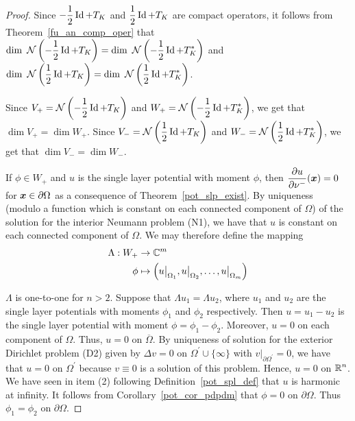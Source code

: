 \begin{proof}
Since $\displaystyle -\frac{1}{2} \operatorname{Id} + T_K$ and
$\displaystyle \frac{1}{2} \operatorname{Id} + T_K$ are compact operators, it
follows from Theorem~\ref{fu_an_comp_oper} that
$\displaystyle \dim\ \mathcal{N} \left(-\frac{1}{2} \operatorname{Id} + T_K\right) =
\dim\ \mathcal{N} \left(-\frac{1}{2} \operatorname{Id} + T_K^\ast \right)$
and $\displaystyle \dim\ \mathcal{N} \left(\frac{1}{2} \operatorname{Id} + T_K\right) =
\dim\ \mathcal{N} \left(\frac{1}{2} \operatorname{Id} + T_K^\ast \right)$.

Since $\displaystyle V_+ = \mathcal{N} \left(-\frac{1}{2} \operatorname{Id} + T_K\right)$
and $\displaystyle W_+ = \mathcal{N} \left(-\frac{1}{2} \operatorname{Id} + T_K^\ast \right)$, 
we get that $\dim V_+ = \dim W_+$.  Since
$\displaystyle V_- = \mathcal{N} \left(\frac{1}{2} \operatorname{Id} + T_K\right)$
and $\displaystyle W_- = \mathcal{N} \left(\frac{1}{2} \operatorname{Id} + T_K^\ast \right)$, 
we get that $\dim V_- = \dim W_-$.

 If $\phi \in W_+$ and $u$ is the single layer potential with
moment $\phi$, then $\displaystyle \frac{\partial{u}}{\partial \nu^-}({\bm{x}}) = 0$
for ${\bm{x}} \in \partial \Omega$ as a consequence of
Theorem~\ref{pot_slp_exist}.  By uniqueness (modulo a
function which is constant on each connected component of $\Omega$)
of the solution for the interior Neumann problem (N1), we have that
$u$ is constant on each connected component of $\Omega$.  We may
therefore define the mapping
\begin{align*}
\Lambda : W_+ & \rightarrow \mathbb{C}^m \\
\phi &\mapsto \left( u\big|_{\Omega_1}, u\big|_{\Omega_2},
\ldots, u\big|_{\Omega_m}\right)
\end{align*}

 $\Lambda$ is one-to-one for $n>2$.  Suppose that
$\Lambda u_1 = \Lambda u_2$, where $u_1$ and $u_2$ are the single
layer potentials with moments $\phi_1$ and $\phi_2$ respectively.
Then $u=u_1-u_2$ is the single layer potential with moment
$\phi = \phi_1-\phi_2$.  Moreover, $u = 0$ on each component of
$\Omega$.  Thus, $u = 0$ on $\overline{\Omega}$.  By uniqueness of
solution for the exterior Dirichlet problem (D2) given by
$\Delta v = 0$ on $\displaystyle \Omega^{\prime} \cup \{\infty\}$ 
with $\displaystyle v\big|_{\partial \Omega^{\prime}}=0$,
we have that $u=0$ on $\Omega^{\prime}$ because $v \equiv 0$ is a
solution of this problem.  Hence, $u=0$ on $\displaystyle \mathbb{R}^n$.
We have seen in item (2) following Definition~\ref{pot_spl_def} that
$u$ is harmonic at infinity.
It follows from Corollary~\ref{pot_cor_pdpdm} that $\phi =0$ on
$\partial \Omega$.  Thus $\phi_1=\phi_2$ on $\partial \Omega$.


\end{proof}
